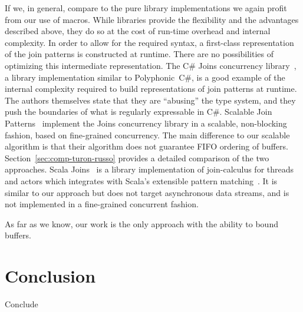 \documentclass[runningheads]{llncs}
\begin{document}
\begin{sloppypar}
If we, in general, compare to the pure library implementations we again profit
from our use of macros. While libraries provide the flexibility and
the advantages described above, they do so at the cost of run-time overhead and
internal complexity. In order to allow for the required syntax, a first-class
representation of the join patterns is constructed at runtime. There are no
possibilities of optimizing this intermediate representation. The C\# Joins
concurrency library~\cite{Russo:2007}, a library implementation similar to
Polyphonic~C\#, is a good example of the internal complexity required to build
representations of join patterns at runtime. The authors themselves state that they are
``abusing'' the type system, and they push the boundaries of what is regularly
expressable in C\#. Scalable Join Patterns~\cite{Turon:2011} implement the Joins concurrency
library in a scalable, non-blocking fashion, based on fine-grained concurrency. The main
difference to our scalable algorithm is that their algorithm does not
guarantee FIFO ordering of buffers. Section~\ref{sec:comp-turon-russo} provides a detailed comparison
of the two approaches. Scala Joins~\cite{Haller:2008} is a library
implementation of join-calculus for threads and actors which integrates with Scala's
extensible pattern matching~\cite{EmirOW07}. It is similar to our approach but does not target
asynchronous data streams, and is not implemented in a fine-grained concurrent fashion.

As far as we know, our work is the only approach with the ability to bound buffers.


\section{Conclusion}\label{sec:conclusion}

Conclude




\end{sloppypar}
\end{document}
